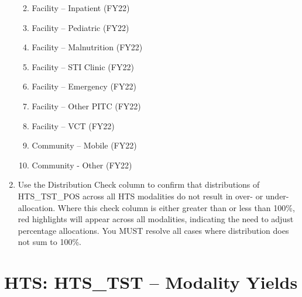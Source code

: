 \documentclass[
  openany]{book}
\begin{document}
\begin{enumerate}
  \begin{enumerate}
  \def\labelenumii{\alph{enumii}.}
  \item
    Facility -- Inpatient (FY22)
  \item
    Facility -- Pediatric (FY22)
  \item
    Facility -- Malnutrition (FY22)
  \item
    Facility -- STI Clinic (FY22)
  \item
    Facility -- Emergency (FY22)
  \item
    Facility -- Other PITC (FY22)
  \item
    Facility -- VCT (FY22)
  \item
    Community -- Mobile (FY22)
  \item
    Community - Other (FY22)
  \end{enumerate}
\item
  Use the Distribution Check column to confirm that distributions of
  HTS\_TST\_POS across all HTS modalities do not result in over- or
  under-allocation. Where this check column is either greater than or
  less than 100\%, red highlights will appear across all modalities,
  indicating the need to adjust percentage allocations. You MUST
  resolve all cases where distribution does not sum to 100\%.
\end{enumerate}

\hypertarget{hts-hts_tst-modality-yields}{%
\section{HTS: HTS\_TST -- Modality Yields}\label{hts-hts_tst-modality-yields}}

\begin{table}[H]
\centering\begingroup\fontsize{12}{14}\selectfont

\endgroup{}
\end{table}
\end{document}
